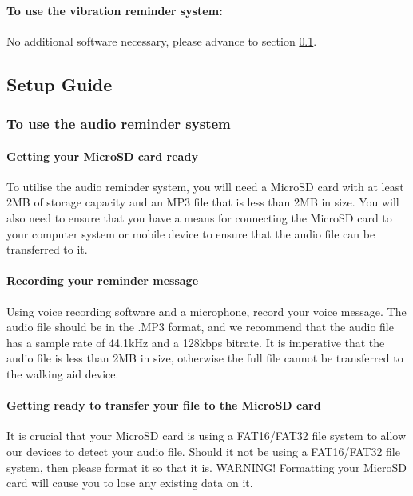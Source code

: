 			\paragraph{To use the vibration reminder system:}\mbox{}

			No additional software necessary, please advance to section \ref{subsec:quick_start_setup_guide}.

		\subsection{Setup Guide}
		\label{subsec:quick_start_setup_guide}

			\subsubsection{To use the audio reminder system}

				\paragraph{Getting your MicroSD card ready}\mbox{}

				To utilise the audio reminder system, you will need a MicroSD card with at least 2MB of storage capacity and an MP3 file that is less than 2MB in size. You will also need to ensure that you have a means for connecting the MicroSD card to your computer system or mobile device to ensure that the audio file can be transferred to it.

				\paragraph{Recording your reminder message}\mbox{}

				Using voice recording software and a microphone, record your voice message. The audio file should be in the .MP3 format, and we recommend that the audio file has a sample rate of 44.1kHz and a 128kbps bitrate. It is imperative that the audio file is less than 2MB in size, otherwise the full file cannot be transferred to the walking aid device.

				\paragraph{Getting ready to transfer your file to the MicroSD card}\mbox{}

				It is crucial that your MicroSD card is using a FAT16/FAT32 file system to allow our devices to detect your audio file. Should it not be using a FAT16/FAT32 file system, then please format it so that it is. WARNING! Formatting your MicroSD card will cause you to lose any existing data on it.

